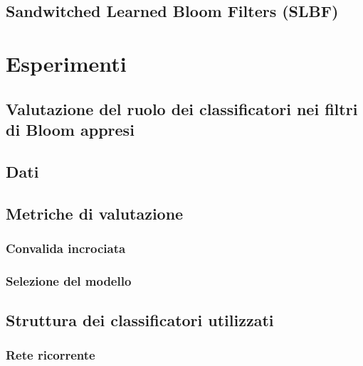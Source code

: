 \documentclass{report}
\begin{document}
    \section{Sandwitched Learned Bloom Filters (SLBF)}

\chapter{Esperimenti}

\section{Valutazione del ruolo dei classificatori nei filtri di Bloom appresi}

\section{Dati}

\section{Metriche di valutazione}
\subsection{Convalida incrociata} %
\subsection{Selezione del modello} %

\section{Struttura dei classificatori utilizzati}
\subsection{Rete ricorrente}
\end{document}
